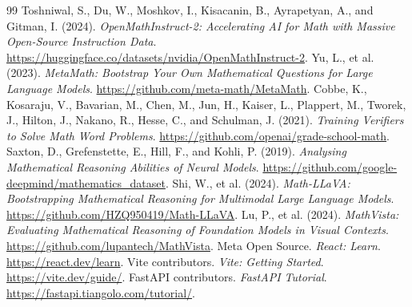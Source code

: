 \documentclass[11pt]{article}
\begin{document}
\begin{thebibliography}{99}
 Toshniwal, S., Du, W., Moshkov, I., Kisacanin, B., Ayrapetyan, A., and Gitman, I. (2024). \emph{OpenMathInstruct-2: Accelerating AI for Math with Massive Open-Source Instruction Data}. \url{https://huggingface.co/datasets/nvidia/OpenMathInstruct-2}.
 Yu, L., et al. (2023). \emph{MetaMath: Bootstrap Your Own Mathematical Questions for Large Language Models}. \url{https://github.com/meta-math/MetaMath}.
 Cobbe, K., Kosaraju, V., Bavarian, M., Chen, M., Jun, H., Kaiser, L., Plappert, M., Tworek, J., Hilton, J., Nakano, R., Hesse, C., and Schulman, J. (2021). \emph{Training Verifiers to Solve Math Word Problems}. \url{https://github.com/openai/grade-school-math}.
 Saxton, D., Grefenstette, E., Hill, F., and Kohli, P. (2019). \emph{Analysing Mathematical Reasoning Abilities of Neural Models}. \url{https://github.com/google-deepmind/mathematics_dataset}.
 Shi, W., et al. (2024). \emph{Math-LLaVA: Bootstrapping Mathematical Reasoning for Multimodal Large Language Models}. \url{https://github.com/HZQ950419/Math-LLaVA}.
 Lu, P., et al. (2024). \emph{MathVista: Evaluating Mathematical Reasoning of Foundation Models in Visual Contexts}. \url{https://github.com/lupantech/MathVista}.
 Meta Open Source. \emph{React: Learn}. \url{https://react.dev/learn}.
 Vite contributors. \emph{Vite: Getting Started}. \url{https://vite.dev/guide/}.
 FastAPI contributors. \emph{FastAPI Tutorial}. \url{https://fastapi.tiangolo.com/tutorial/}.
\end{thebibliography}
\end{document}
